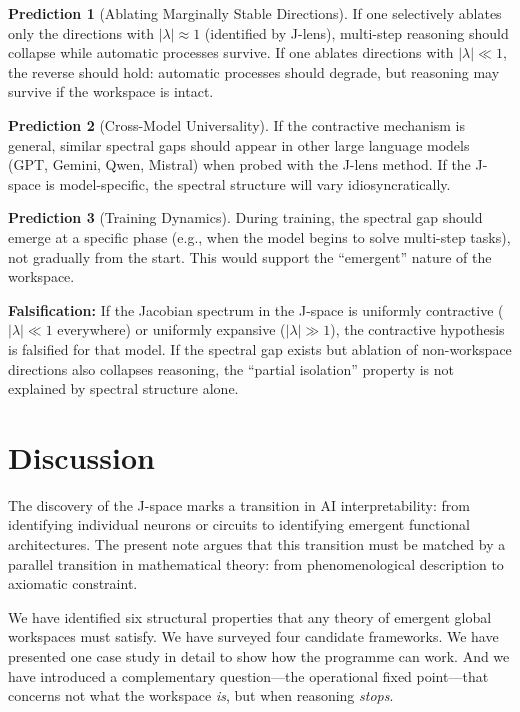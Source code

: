 \documentclass[11pt,a4paper]{article}
\theoremstyle{definition}
\newtheorem{prediction}{Prediction}
\begin{document}
\begin{prediction}[Ablating Marginally Stable Directions]
If one selectively ablates only the directions with $|\lambda| \approx 1$
(identified by J-lens), multi-step reasoning should collapse while automatic
processes survive. If one ablates directions with $|\lambda| \ll 1$, the
reverse should hold: automatic processes should degrade, but reasoning may
survive if the workspace is intact.
\end{prediction}

\begin{prediction}[Cross-Model Universality]
If the contractive mechanism is general, similar spectral gaps should appear
in other large language models (GPT, Gemini, Qwen, Mistral) when probed with
the J-lens method. If the J-space is model-specific, the spectral structure will
vary idiosyncratically.
\end{prediction}

\begin{prediction}[Training Dynamics]
During training, the spectral gap should emerge at a specific phase (e.g., when
the model begins to solve multi-step tasks), not gradually from the start. This
would support the ``emergent'' nature of the workspace.
\end{prediction}

\textbf{Falsification:} If the Jacobian spectrum in the J-space is uniformly
contractive ($|\lambda| \ll 1$ everywhere) or uniformly expansive
($|\lambda| \gg 1$), the contractive hypothesis is falsified for that model.
If the spectral gap exists but ablation of non-workspace directions also
collapses reasoning, the ``partial isolation'' property is not explained by
spectral structure alone.

\section{Discussion}
\label{sec:discussion}

The discovery of the J-space marks a transition in AI interpretability: from
identifying individual neurons or circuits to identifying emergent functional
architectures. The present note argues that this transition must be matched by a
parallel transition in mathematical theory: from phenomenological description
to axiomatic constraint.

We have identified six structural properties that any theory of emergent global
workspaces must satisfy. We have surveyed four candidate frameworks. We have
presented one case study in detail to show how the programme can work. And we
have introduced a complementary question---the operational fixed point---that
concerns not what the workspace \emph{is}, but when reasoning \emph{stops}.
\end{document}
